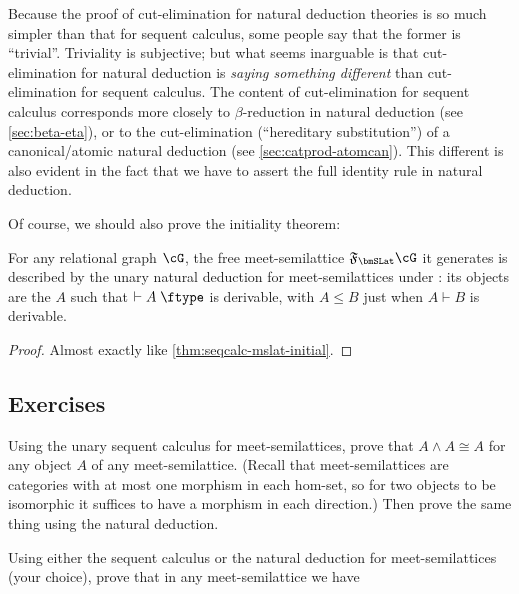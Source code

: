 \documentclass{book}
\let\types\vdash
\def\type{\;\ftype}
\newcommand{\F}[1]{\mathfrak{F}_{#1}}
\let\meet\wedge
\begin{document}
\begin{rmk}
  Because the proof of cut-elimination for natural deduction theories is so much simpler than that for sequent calculus, some people say that the former is ``trivial''.
  Triviality is subjective; but what seems inarguable is that cut-elimination for natural deduction is \emph{saying something different} than cut-elimination for sequent calculus.
  The content of cut-elimination for sequent calculus corresponds more closely to $\beta$-reduction in natural deduction (see \cref{sec:beta-eta}), or to the cut-elimination (``hereditary substitution'') of a canonical/atomic natural deduction (see \cref{sec:catprod-atomcan}).
  This different is also evident in the fact that we have to assert the full identity rule in natural deduction.
\end{rmk}

Of course, we should also prove the initiality theorem:

\begin{thm}\label{thm:natded-mslat-initial}
  For any relational graph $\cG$, the free meet-semilattice $\F\bmSLat \cG$ it generates is described by the unary natural deduction for meet-semilattices under \cG: its objects are the $A$ such that $\types A\type$ is derivable, with $A\le B$ just when $A\types B$ is derivable.
\end{thm}
\begin{proof}
  Almost exactly like \cref{thm:seqcalc-mslat-initial}.
\end{proof}

\subsection*{Exercises}

\begin{ex}\label{ex:mslat-idem}
  Using the unary sequent calculus for meet-semilattices, prove that $A\meet A \cong A$ for any object $A$ of any meet-semilattice.
  (Recall that meet-semilattices are categories with at most one morphism in each hom-set, so for two objects to be isomorphic it suffices to have a morphism in each direction.)
  Then prove the same thing using the natural deduction.
\end{ex}

\begin{ex}\label{ex:mslat-monoid}
  Using either the sequent calculus or the natural deduction for meet-semilattices (your choice), prove that in any meet-semilattice we have
\end{ex}
\end{document}
